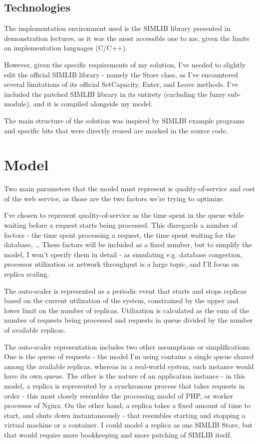 \documentclass{scrartcl}
\begin{document}
\subsection{Technologies}
\label{sec-2-1}
The implementation environment used is the SIMLIB library presented in
demonstration lectures, as it was the most accessible one to me, given the
limits on implementation languages (C/C++).

However, given the specific requirements of my solution, I've needed to slightly
edit the official SIMLIB library - namely the Store class, as I've encountered
several limitations of its official SetCapacity, Enter, and Leave methods. I've
included the patched SIMLIB library in its entirety (excluding the fuzzy
sub-module), and it is compiled alongside my model.

The main structure of the solution was inspired by SIMLIB example programs and
specific bits that were directly reused are marked in the source code.

\section{Model}
\label{sec-3}
Two main parameters that the model must represent is quality-of-service and cost
of the web service, as those are the two factors we're trying to optimize.

I've chosen to represent quality-of-service as the time spent in the queue while
waiting before a request starts being processed. This disregards a number of
factors - the time spent processing a request, the time spent waiting for the
database, \ldots{} These factors will be included as a fixed number, but to simplify
the model, I won't specify them in detail - as simulating e.g. database
congestion, processor utilization or network throughput is a large topic, and
I'll focus on replica scaling.

The auto-scaler is represented as a periodic event that starts and stops
replicas based on the current utilization of the system, constrained by the
upper and lower limit on the number of replicas. Utilization is calculated as
the sum of the number of requests being processed and requests in queue divided
by the number of available replicas.

The auto-scaler representation includes two other assumptions or
simplifications. One is the queue of requests - the model I'm using contains a
single queue shared among the available replicas, whereas in a real-world
system, each instance would have its own queue. The other is the nature of an
application instance - in this model, a replica is represented by a synchronous
process that takes requests in order - this most closely resembles the
processing model of PHP, or worker processes of Nginx. On the other hand, a
replica takes a fixed amount of time to start, and shuts down instantaneously -
that resembles starting and stopping a virtual machine or a container. I could
model a replica as one SIMLIB Store, but that would require more bookkeeping and
more patching of SIMLIB itself.
\end{document}
